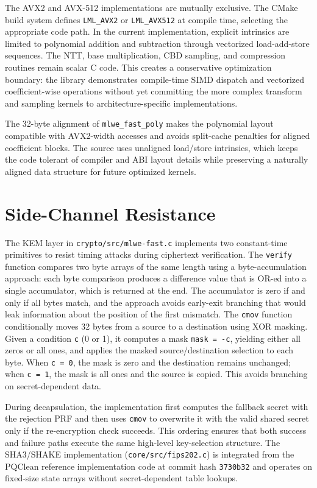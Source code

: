 The AVX2 and AVX-512 implementations are mutually exclusive. The CMake build system defines \texttt{LML\_AVX2} or \texttt{LML\_AVX512} at compile time, selecting the appropriate code path. In the current implementation, explicit intrinsics are limited to polynomial addition and subtraction through vectorized load-add-store sequences. The NTT, base multiplication, CBD sampling, and compression routines remain scalar C code. This creates a conservative optimization boundary: the library demonstrates compile-time SIMD dispatch and vectorized coefficient-wise operations without yet committing the more complex transform and sampling kernels to architecture-specific implementations.

The 32-byte alignment of \texttt{mlwe\_fast\_poly} makes the polynomial layout compatible with AVX2-width accesses and avoids split-cache penalties for aligned coefficient blocks. The source uses unaligned load/store intrinsics, which keeps the code tolerant of compiler and ABI layout details while preserving a naturally aligned data structure for future optimized kernels.

\section{Side-Channel Resistance}
\label{sec:side_channel}

The KEM layer in \texttt{crypto/src/mlwe-fast.c} implements two constant-time primitives to resist timing attacks during ciphertext verification. The \texttt{verify} function compares two byte arrays of the same length using a byte-accumulation approach: each byte comparison produces a difference value that is OR-ed into a single accumulator, which is returned at the end. The accumulator is zero if and only if all bytes match, and the approach avoids early-exit branching that would leak information about the position of the first mismatch. The \texttt{cmov} function conditionally moves 32 bytes from a source to a destination using XOR masking. Given a condition \texttt{c} (0 or 1), it computes a mask \texttt{mask = -c}, yielding either all zeros or all ones, and applies the masked source/destination selection to each byte. When \texttt{c = 0}, the mask is zero and the destination remains unchanged; when \texttt{c = 1}, the mask is all ones and the source is copied. This avoids branching on secret-dependent data.

During decapsulation, the implementation first computes the fallback secret with the rejection PRF and then uses \texttt{cmov} to overwrite it with the valid shared secret only if the re-encryption check succeeds. This ordering ensures that both success and failure paths execute the same high-level key-selection structure. The SHA3/SHAKE implementation (\texttt{core/src/fips202.c}) is integrated from the PQClean reference implementation code at commit hash \texttt{3730b32} and operates on fixed-size state arrays without secret-dependent table lookups.

